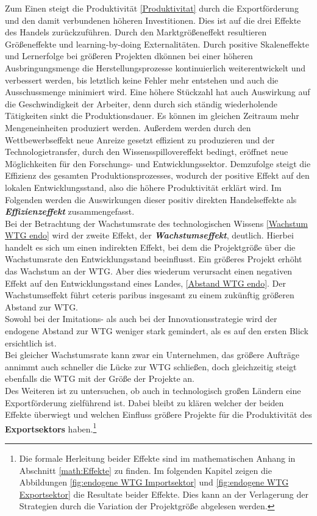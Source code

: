 %
Zum Einen steigt die Produktivität \eqref{Produktivitat} durch die Exportförderung und den damit verbundenen höheren Investitionen. Dies ist auf die drei Effekte des Handels zurückzuführen. Durch den Marktgrößeneffekt resultieren Größeneffekte und learning-by-doing Externalitäten. Durch positive Skaleneffekte und Lernerfolge bei größeren Projekten dkönnen bei einer höheren Ausbringungsmenge die Herstellungsprozesse kontinuierlich weiterentwickelt und verbessert werden, bis letztlich keine Fehler mehr entstehen und auch die Ausschussmenge minimiert wird. Eine höhere Stückzahl hat auch Auswirkung auf die Geschwindigkeit der Arbeiter, denn durch sich ständig wiederholende Tätigkeiten sinkt die Produktionsdauer. Es können im gleichen Zeitraum mehr Mengeneinheiten produziert werden. Außerdem werden durch den Wettbewerbseffekt neue Anreize gesetzt effizient zu produzieren und der Technologietransfer, durch den Wissensspillovereffekt bedingt, eröffnet neue Möglichkeiten für den Forschungs- und Entwicklungssektor. Demzufolge steigt die Effizienz des gesamten Produktionsprozesses, wodurch der positive Effekt auf den lokalen Entwicklungsstand, also die höhere Produktivität erklärt wird. Im Folgenden werden die Auswirkungen dieser positiv direkten Handelseffekte als \textbf{\textit{Effizienzeffekt}} zusammengefasst. \\
%
Bei der Betrachtung der Wachstumsrate des technologischen Wissens \eqref{Wachstum WTG endo} wird der zweite Effekt, der \textbf{\textit{Wachstumseffekt}}, deutlich. Hierbei handelt es sich um einen indirekten Effekt, bei dem die Projektgröße über die Wachstumsrate den Entwicklungsstand beeinflusst. Ein größeres Projekt erhöht das Wachstum an der WTG. Aber dies wiederum verursacht einen negativen Effekt auf den Entwicklungsstand eines Landes, \eqref{Abstand WTG endo}. Der Wachstumseffekt führt ceteris paribus insgesamt zu einem zukünftig größeren Abstand zur WTG.\\
%
Sowohl bei der Imitations- als auch bei der Innovationsstrategie wird der endogene Abstand zur WTG weniger stark gemindert, als es auf den ersten Blick ersichtlich ist.\\
%
Bei gleicher Wachstumsrate kann zwar ein Unternehmen, das größere Aufträge annimmt auch schneller die Lücke zur WTG schließen, doch gleichzeitig steigt ebenfalls die WTG mit der Größe der Projekte an.\\
%
Des Weiteren ist zu untersuchen, ob auch in technologisch großen Ländern eine Exportförderung zielführend ist. Dabei bleibt zu klären welcher der beiden Effekte überwiegt und welchen Einfluss größere Projekte für die Produktivität des \textbf{Exportsektors} haben.\footnote{Die formale Herleitung beider Effekte sind im mathematischen Anhang in Abschnitt \ref{math:Effekte} zu finden. Im folgenden Kapitel zeigen die Abbildungen \ref{fig:endogene WTG Importsektor} und \ref{fig:endogene WTG Exportsektor} die Resultate beider Effekte. Dies kann an der Verlagerung der Strategien durch die Variation der Projektgröße abgelesen werden.}\\
